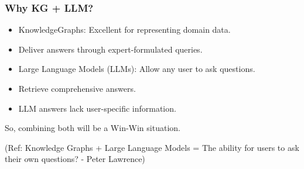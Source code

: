 




\begin{frame}[fragile]\frametitle{Why KG + LLM?}

\begin{itemize}
\item KnowledgeGraphs: Excellent for representing domain data.
\item Deliver answers through expert-formulated queries.
\item Large Language Models (LLMs): Allow any user to ask questions.
\item Retrieve comprehensive answers.
\item LLM answers lack user-specific information.
\end{itemize}
	
So, combining both will be a Win-Win situation.

{\tiny (Ref: Knowledge Graphs + Large Language Models = The ability for users to ask their own questions? - Peter Lawrence)}

\end{frame}

